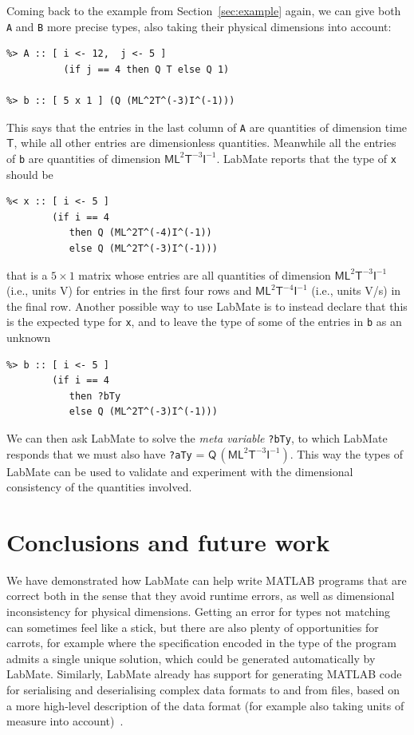 \documentclass{IMEKO2024}
\newcommand{\remph}{\emph}
\begin{document}
Coming back to the example from Section~\ref{sec:example} again, we can give both \texttt{A} and \texttt{B} more precise types, also taking their physical dimensions into account:
\begin{verbatim}
%> A :: [ i <- 12,  j <- 5 ]
          (if j == 4 then Q T else Q 1)

%> b :: [ 5 x 1 ] (Q (ML^2T^(-3)I^(-1)))
\end{verbatim}
This says that the entries in the last column of \texttt{A} are quantities of dimension time $\mathsf{T}$, while all other entries are dimensionless quantities. Meanwhile all the entries of \texttt{b} are quantities of dimension $\mathsf{ML}^{2}\mathsf{T}^{-3}\mathsf{I}^{-1}$. LabMate reports that the type of \texttt{x} should be
\begin{verbatim}
%< x :: [ i <- 5 ]
        (if i == 4
           then Q (ML^2T^(-4)I^(-1))
           else Q (ML^2T^(-3)I^(-1)))
\end{verbatim}
that is a $5 \times 1$ matrix whose entries are all quantities of dimension $\mathsf{ML}^{2}\mathsf{T}^{-3}\mathsf{I}^{-1}$ (i.e., units V) for entries in the first four rows and $\mathsf{ML}^{2}\mathsf{T}^{-4}\mathsf{I}^{-1}$ (i.e., units V/s) in the final row.
%
Another possible way to use LabMate is to instead declare that this is the expected type for \texttt{x}, and to leave the type of some of the entries in \texttt{b} as an unknown
\begin{verbatim}
%> b :: [ i <- 5 ]
        (if i == 4
           then ?bTy
           else Q (ML^2T^(-3)I^(-1)))
\end{verbatim}
We can then ask LabMate to solve the \remph{meta variable} \texttt{?bTy}, to which LabMate responds that we must also have \texttt{?aTy} = $\mathsf{Q}\,(\mathsf{ML}^{2}\mathsf{T}^{-3}\mathsf{I}^{-1})$. This way the types of LabMate can be used to validate and experiment with the dimensional consistency of the quantities involved.



\section{Conclusions and future work}

We have demonstrated how LabMate can help write MATLAB programs that are correct both in the sense that they avoid runtime errors, as well as dimensional inconsistency for physical dimensions.
%
Getting an error for types not matching can sometimes feel like a stick, but there are also plenty of opportunities for carrots, for example where the specification encoded in the type of the program admits a single unique solution, which could be generated automatically by LabMate.
%
Similarly, LabMate already has support for generating MATLAB code for serialising and deserialising complex data formats to and from files, based on a more high-level description of the data format (for example also taking units of measure into account)~\cite{mgen}.
\end{document}
